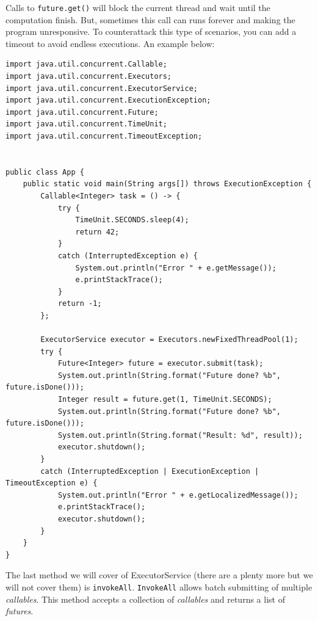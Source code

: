\documentclass[openany, a4paper]{book}
\theoremstyle{break}
\theoremstyle{example}
\theoremstyle{note}
\theoremstyle{break}
\theoremstyle{exercise}
\begin{document}
Calls to \texttt{future.get()} will block the current thread and wait until the
computation finish. But, sometimes this call can runs forever and making the
program unresponsive. To counterattack this type of scenarios, you can add a
timeout to avoid endless executions. An example below:

\begin{verbatim}
import java.util.concurrent.Callable;
import java.util.concurrent.Executors;
import java.util.concurrent.ExecutorService;
import java.util.concurrent.ExecutionException;
import java.util.concurrent.Future;
import java.util.concurrent.TimeUnit;
import java.util.concurrent.TimeoutException;


public class App {
    public static void main(String args[]) throws ExecutionException {
        Callable<Integer> task = () -> {
            try {
                TimeUnit.SECONDS.sleep(4);
                return 42;
            }
            catch (InterruptedException e) {
                System.out.println("Error " + e.getMessage());
                e.printStackTrace();
            }
            return -1;
        };

        ExecutorService executor = Executors.newFixedThreadPool(1);
        try {
            Future<Integer> future = executor.submit(task);
            System.out.println(String.format("Future done? %b", future.isDone()));
            Integer result = future.get(1, TimeUnit.SECONDS);
            System.out.println(String.format("Future done? %b", future.isDone()));
            System.out.println(String.format("Result: %d", result));
            executor.shutdown();
        }
        catch (InterruptedException | ExecutionException | TimeoutException e) {
            System.out.println("Error " + e.getLocalizedMessage());
            e.printStackTrace();
            executor.shutdown();
        }
    }
}
\end{verbatim}


The last method we will cover of ExecutorService (there are a plenty more
but we will not cover them) is \texttt{invokeAll}. \texttt{InvokeAll} allows batch submitting
of multiple \emph{callables}. This method accepts a collection of \emph{callables} and
returns a list of \emph{futures}.
\end{document}
